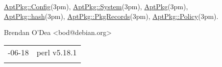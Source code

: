 \documentclass[]{article}
\renewcommand{\emph}[1]{\underline{#1}}
\begin{document}
\emph{AptPkg::Config}(3pm), \emph{AptPkg::System}(3pm),
\emph{AptPkg}(3pm), \emph{AptPkg::hash}(3pm),
\emph{AptPkg::PkgRecords}(3pm), \emph{AptPkg::Policy}(3pm).


Brendan O'Dea \textless{}bod@debian.org\textgreater{}

\begin{longtable}[c]{@{}ll@{}}
\toprule\addlinespace
2013-06-18 & perl v5.18.1
\\\addlinespace
\bottomrule
\end{longtable}
\end{document}
